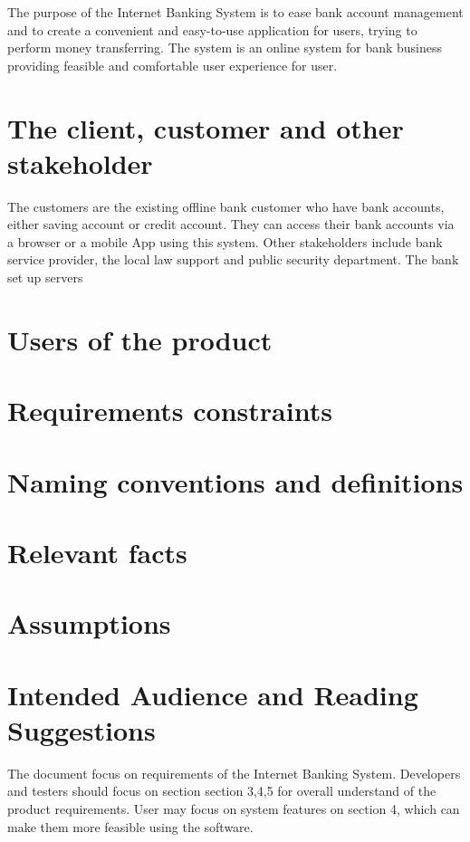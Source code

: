 \documentclass{scrreprt}
\begin{document}
The purpose of the Internet Banking System is to ease bank account management and to create a convenient and easy-to-use application for users, trying to perform money transferring. The system is an online system for bank business providing feasible and comfortable user experience for user.

\section{The client, customer and other stakeholder}
The customers are the existing offline bank customer who have bank accounts, either saving account or credit account. They can access their bank accounts via a browser or a mobile App using this system.
Other stakeholders include bank service provider, the local law support and public security department. The bank set up servers 
\section{Users of the product}

\section{Requirements constraints}


\section{Naming conventions and definitions}


\section{Relevant facts}

\section{Assumptions}

\section{Intended Audience and Reading Suggestions}
The document focus on requirements of the Internet Banking System. Developers and testers should focus on section section 3,4,5 for overall understand of the product requirements. User may focus on system features on section 4, which can make them more feasible using the software.
\end{document}
